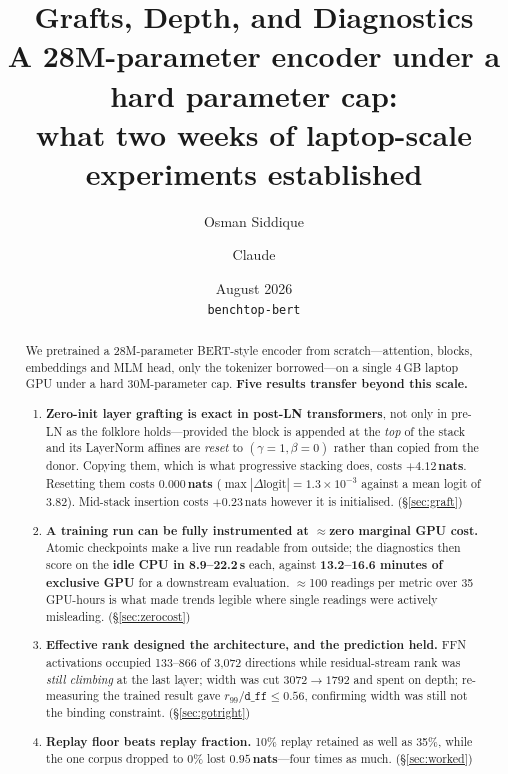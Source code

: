 \documentclass[11pt,a4paper]{article}
\title{\bfseries Grafts, Depth, and Diagnostics\\[0.3em]
\large A 28M-parameter encoder under a hard parameter cap:\\
what two weeks of laptop-scale experiments established}
\author{Osman Siddique \and Claude}
\date{August 2026\\[0.3em]\small\texttt{benchtop-bert}}
\newcommand{\dff}{\texttt{d\_ff}}
\newcommand{\nats}[1]{\ensuremath{#1}\,nats}
\begin{document}
\maketitle

\begin{abstract}
\noindent
We pretrained a 28M-parameter BERT-style encoder from scratch---attention, blocks, embeddings
and MLM head, only the tokenizer borrowed---on a single 4\,GB laptop GPU under a hard
30M-parameter cap. \textbf{Five results transfer beyond this scale.}

\begin{enumerate}[leftmargin=1.4em,itemsep=4pt]
\item \textbf{Zero-init layer grafting is exact in post-LN transformers}, not only in pre-LN as
the folklore holds---provided the block is appended at the \emph{top} of the stack and its
LayerNorm affines are \emph{reset} to $(\gamma{=}1,\beta{=}0)$ rather than copied from the
donor. Copying them, which is what progressive stacking does, costs \textbf{\nats{{+}4.12}}.
Resetting them costs \textbf{\nats{0.000}} ($\max|\Delta\text{logit}| = 1.3\times10^{-3}$
against a mean logit of 3.82). Mid-stack insertion costs \nats{{+}0.23} however it is
initialised. (\S\ref{sec:graft})

\item \textbf{A training run can be fully instrumented at $\approx$zero marginal GPU cost.}
Atomic checkpoints make a live run readable from outside; the diagnostics then score on the
\textbf{idle CPU in 8.9--22.2\,s} each, against \textbf{13.2--16.6 minutes of exclusive GPU} for
a downstream evaluation. $\approx$100 readings per metric over 35 GPU-hours is what made trends
legible where single readings were actively misleading. (\S\ref{sec:zerocost})

\item \textbf{Effective rank designed the architecture, and the prediction held.} FFN
activations occupied 133--866 of 3{,}072 directions while residual-stream rank was \emph{still
climbing} at the last layer; width was cut $3072 \to 1792$ and spent on depth; re-measuring the
trained result gave $r_{99}/\dff \leq 0.56$, confirming width was still not the binding
constraint. (\S\ref{sec:gotright})

\item \textbf{Replay floor beats replay fraction.} 10\% replay retained as well as 35\%, while
the one corpus dropped to 0\% lost \textbf{\nats{0.95}}---four times as much.
(\S\ref{sec:worked})


\end{enumerate}
\end{abstract}
\end{document}
